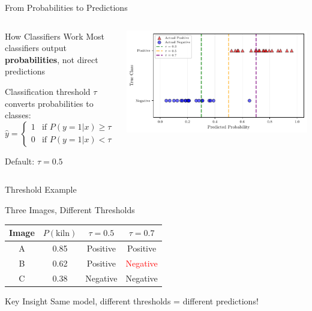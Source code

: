 \documentclass{beamer}
\begin{document}
\begin{frame}{From Probabilities to Predictions}
\begin{columns}
\begin{column}{0.48\textwidth}
\begin{definitionbox}{How Classifiers Work}
\small
Most classifiers output \textbf{probabilities}, not direct predictions

\vspace{0.15cm}

Classification threshold $\tau$ converts probabilities to classes:
$$\hat{y} = \begin{cases}
1 & \text{if } P(y=1|x) \geq \tau \\
0 & \text{if } P(y=1|x) < \tau
\end{cases}$$

Default: $\tau = 0.5$
\end{definitionbox}
\end{column}
\begin{column}{0.52\textwidth}
\includegraphics[width=\textwidth]{threshold-effect-diagram.pdf}
\end{column}
\end{columns}
\end{frame}

\begin{frame}{Threshold Example}
\begin{examplebox}{Three Images, Different Thresholds}
\small
\begin{center}
\begin{tabular}{|c|c|c|c|}
\hline
Image & $P(\text{kiln})$ & $\tau=0.5$ & $\tau=0.7$ \\
\hline
A & 0.85 & Positive & Positive \\
B & 0.62 & Positive & \textcolor{red}{Negative} \\
C & 0.38 & Negative & Negative \\
\hline
\end{tabular}
\end{center}
\end{examplebox}

\vspace{0.15cm}

\begin{keypointsbox}{Key Insight}
\small
Same model, different thresholds = different predictions!
\end{keypointsbox}
\end{frame}
\end{document}
